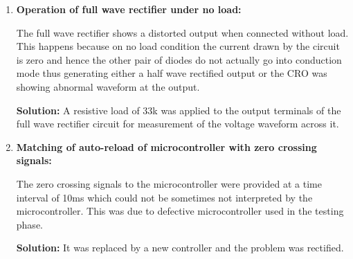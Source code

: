 \begin{enumerate}
			\item \textbf{Operation of full wave rectifier under no load:}
			
			The full wave rectifier shows a distorted output when connected without load. This happens because on no load condition the current drawn by the circuit is zero and hence the other pair of diodes do not actually go into conduction mode thus generating either a half wave rectified output or the CRO was showing abnormal waveform at the output.  
			
			\textbf{Solution:} A resistive load of 33k was applied to the  output terminals of the full wave rectifier circuit for measurement of the voltage waveform across it.  
			
			\item \textbf{Matching of auto-reload of microcontroller with zero crossing signals:}
			
			The zero crossing signals to the microcontroller were provided at a time interval of 10ms which could not be sometimes not interpreted by the microcontroller. This was due to defective microcontroller used in the testing phase.
			
			\textbf{Solution:} It was replaced by a new controller and the problem was rectified.
			
			
			\end{enumerate}
